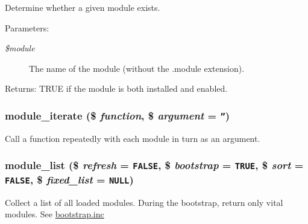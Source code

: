 Determine whether a given module exists.

\begin{Desc}
\item[Parameters:]
\begin{description}
\item[{\em \$module}]The name of the module (without the .module extension). \end{description}
\end{Desc}
\begin{Desc}
\item[Returns:]TRUE if the module is both installed and enabled. \end{Desc}
\hypertarget{module_8inc_11da9b347b2de5df27272537417f6272}{
\subsubsection[{module\_\-iterate}]{\setlength{\rightskip}{0pt plus 5cm}module\_\-iterate (\$ {\em function}, \/  \$ {\em argument} = {\tt ''})}}
\label{module_8inc_11da9b347b2de5df27272537417f6272}


Call a function repeatedly with each module in turn as an argument. \hypertarget{module_8inc_2adef9e0d4a1d838d1bf6a5643bb9ebd}{
\subsubsection[{module\_\-list}]{\setlength{\rightskip}{0pt plus 5cm}module\_\-list (\$ {\em refresh} = {\tt FALSE}, \/  \$ {\em bootstrap} = {\tt TRUE}, \/  \$ {\em sort} = {\tt FALSE}, \/  \$ {\em fixed\_\-list} = {\tt NULL})}}
\label{module_8inc_2adef9e0d4a1d838d1bf6a5643bb9ebd}


Collect a list of all loaded modules. During the bootstrap, return only vital modules. See \hyperlink{bootstrap_8inc}{bootstrap.inc}

